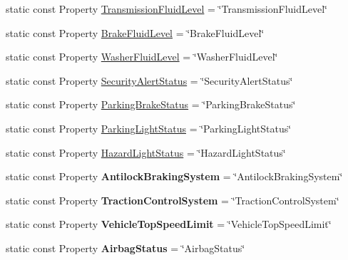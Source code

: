 \begin{DoxyCompactItemize}
\item 
static const Property \hyperlink{classVehicleProperty_a288aa5c2be698825142da9d87c13c447}{Transmission\-Fluid\-Level} = \char`\"{}Transmission\-Fluid\-Level\char`\"{}
\item 
static const Property \hyperlink{classVehicleProperty_a83bc635222e9ba14dfa134defa21e825}{Brake\-Fluid\-Level} = \char`\"{}Brake\-Fluid\-Level\char`\"{}
\item 
static const Property \hyperlink{classVehicleProperty_a37c8c7e827625705d2f560ab53ee8d23}{Washer\-Fluid\-Level} = \char`\"{}Washer\-Fluid\-Level\char`\"{}
\item 
static const Property \hyperlink{classVehicleProperty_a7bc28af663879a2ac9145e5b97a5da4f}{Security\-Alert\-Status} = \char`\"{}Security\-Alert\-Status\char`\"{}
\item 
static const Property \hyperlink{classVehicleProperty_a848ad7334c7aa14709fe2e8c3a1b2608}{Parking\-Brake\-Status} = \char`\"{}Parking\-Brake\-Status\char`\"{}
\item 
static const Property \hyperlink{classVehicleProperty_a505ffc37974f674df55a97c27a7ba0b7}{Parking\-Light\-Status} = \char`\"{}Parking\-Light\-Status\char`\"{}
\item 
static const Property \hyperlink{classVehicleProperty_a21058071101327c72251e2e09e24cb67}{Hazard\-Light\-Status} = \char`\"{}Hazard\-Light\-Status\char`\"{}
\item 
\hypertarget{classVehicleProperty_ab3ed7359914eb1aad8aff1a3409b1f0c}{static const Property {\bfseries Antilock\-Braking\-System} = \char`\"{}Antilock\-Braking\-System\char`\"{}}\label{classVehicleProperty_ab3ed7359914eb1aad8aff1a3409b1f0c}

\item 
\hypertarget{classVehicleProperty_a16b20920ac636662cc4accacde1a434f}{static const Property {\bfseries Traction\-Control\-System} = \char`\"{}Traction\-Control\-System\char`\"{}}\label{classVehicleProperty_a16b20920ac636662cc4accacde1a434f}

\item 
\hypertarget{classVehicleProperty_aa33a83620bfe2ece493a8e8e7e1fdbcc}{static const Property {\bfseries Vehicle\-Top\-Speed\-Limit} = \char`\"{}Vehicle\-Top\-Speed\-Limit\char`\"{}}\label{classVehicleProperty_aa33a83620bfe2ece493a8e8e7e1fdbcc}

\item 
\hypertarget{classVehicleProperty_a341a783cf4746bb7388ee460e62c309e}{static const Property {\bfseries Airbag\-Status} = \char`\"{}Airbag\-Status\char`\"{}}\label{classVehicleProperty_a341a783cf4746bb7388ee460e62c309e}


\end{DoxyCompactItemize}
